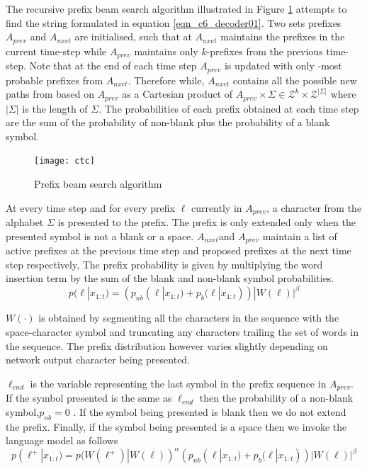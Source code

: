 The recursive prefix beam search algorithm illustrated in Figure \ref{fig_c6_decoder01} attempts to find the string formulated in equation \ref{eqn_c6_decoder01}.  Two sets prefixes $A_{prev}$ and $A_{nxet}$ are initialised, such that at $A_{nxet}$ maintains the prefixes in the current time-step while $A_{prev}$ maintains only $k$-prefixes from the previous time-step.  Note that at the end of each time step $A_{prev}$ is updated with only -most probable prefixes from $A_{nxet}$. Therefore while,  $A_{nxet}$ contains all the possible new paths from based on $A_{prev}$ as a Cartesian product of $A_{prev} \times \Sigma \in \mathcal{Z}^k\times\mathcal{Z}^{|\Sigma|}$ where $|\Sigma|$ is the length of $\Sigma$. The probabilities of each prefix obtained at each time step are the sum of the probability of non-blank plus the probability of a blank symbol.
\begin{figure}
    \texttt{[image: ctc]}
    \caption{Prefix beam search algorithm}
    \label{fig_c6_decoder01}
\end{figure}

At every  time step and for every prefix $\ell$ currently in $A_{prev}$, a character from the alphabet $\Sigma$ is presented to the prefix. The prefix is only extended only when the presented symbol is not a blank or a space. $A_{nxet}$and  $A_{prev}$ maintain a list of active prefixes at the previous time step and proposed prefixes at the next time step respectively, The prefix probability is given by multiplying the word insertion term by the sum of the blank and non-blank symbol probabilities.
\begin{equation}
p(\ell|x_{1:t})=(p_{nb}(\ell|x_{1:t})+p_b(\ell|x_{1:t}))|W(\ell)|^\beta
\label{eqn_c6_decoder03}
\end{equation}

$W(\cdot)$ is obtained by segmenting all the characters in the sequence with the space-character symbol and truncating any characters trailing the  set of words in the sequence.  The prefix distribution however varies slightly depending on network output character being presented.

$\ell_{end}$ is the variable representing the last symbol in the prefix sequence in $A_{prev}$. If the symbol presented is the same as $\ell_{end}$ then the probability of a non-blank symbol,$p_{nb}=0$ . If the symbol being presented is blank then we do not extend the prefix.  Finally, if the symbol being presented is a space then we invoke the language model as follows
\begin{equation}
p(\ell^+|x_{1:t})=p(W(\ell^+)|W(\ell))^\alpha(p_{nb}(\ell|x_{1:t})+p_b(\ell|x_{1:t}))|W(\ell)|^\beta
\label{eqn_c6_decoder03}
\end{equation}

